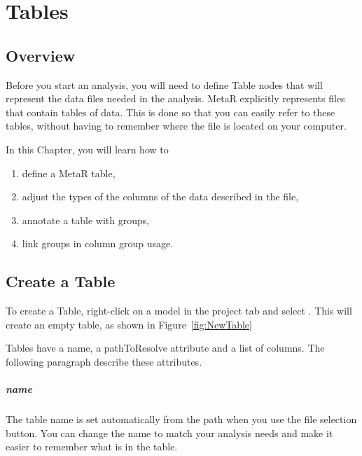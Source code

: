 


\chapter{Tables}\label{chap:Tables}
\section{Overview}
Before you start an analysis, you will need to define Table nodes that will represent the data files needed in the analysis. MetaR explicitly represents files that contain tables of data. This is done so that you can easily refer to these tables, without having to remember where the file is located on your computer. 

\noindent In this Chapter, you will learn how to 
\begin{enumerate}
	\item define a MetaR table,
	\item  adjust the types of the columns of the data described in the file,
	\item annotate a table with groups,
	\item link groups in column group usage.
\end{enumerate}

\section{Create a Table}\label{sec:CreateATable}
To create a Table, right-click on a model in the project tab and select . This will create an empty table, as shown in Figure~\ref{fig:NewTable} 

Tables have a name, a pathToResolve attribute and a list of columns. The following paragraph describe these attributes.
\paragraph{name}
The table name is set automatically from the path when you use the file selection button. You can change the name to match your analysis needs and make it easier to remember what is in the table.
